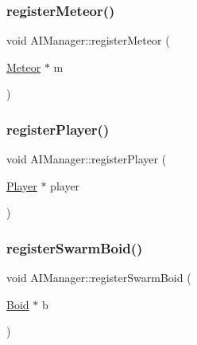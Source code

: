\subsubsection{\texorpdfstring{register\+Meteor()}{registerMeteor()}}
{\footnotesize\ttfamily void A\+I\+Manager\+::register\+Meteor (\begin{DoxyParamCaption}\item[{\hyperlink{class_meteor}{Meteor} $\ast$}]{m }\end{DoxyParamCaption})\hspace{0.3cm}{\ttfamily [static]}}

\hypertarget{class_a_i_manager_a2154de38a09bfcd16ddc202c56467b0b}{}\label{class_a_i_manager_a2154de38a09bfcd16ddc202c56467b0b} 
\subsubsection{\texorpdfstring{register\+Player()}{registerPlayer()}}
{\footnotesize\ttfamily void A\+I\+Manager\+::register\+Player (\begin{DoxyParamCaption}\item[{\hyperlink{class_player}{Player} $\ast$}]{player }\end{DoxyParamCaption})\hspace{0.3cm}{\ttfamily [static]}}

\hypertarget{class_a_i_manager_ae76cc0872ad978e4a36ab41522bb1ea4}{}\label{class_a_i_manager_ae76cc0872ad978e4a36ab41522bb1ea4} 
\subsubsection{\texorpdfstring{register\+Swarm\+Boid()}{registerSwarmBoid()}}
{\footnotesize\ttfamily void A\+I\+Manager\+::register\+Swarm\+Boid (\begin{DoxyParamCaption}\item[{\hyperlink{class_boid}{Boid} $\ast$}]{b }\end{DoxyParamCaption})\hspace{0.3cm}{\ttfamily [static]}}

\hypertarget{class_a_i_manager_a6fb60f6d1707822f1d692272467cc06e}{}\label{class_a_i_manager_a6fb60f6d1707822f1d692272467cc06e} 
